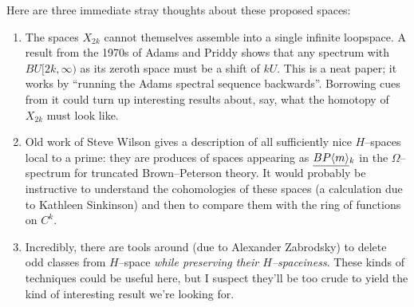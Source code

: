 \documentclass{amsart}
\newcommand{\<}{\langle}
\renewcommand{\>}{\rangle}
\newcommand{\OS}[2]{\smash{\underline{#1}}_{#2}}
\theoremstyle{plain}
\theoremstyle{definition}
\theoremstyle{remark}
\begin{document}
Here are three immediate stray thoughts about these proposed spaces:
\begin{enumerate}
\item The spaces $X_{2k}$ cannot themselves assemble into a single infinite loopspace. A result from the 1970s of Adams and Priddy shows that any spectrum with $BU[2k, \infty)$ as its zeroth space must be a shift of $kU$.  This is a neat paper; it works by ``running the Adams spectral sequence backwards''.  Borrowing cues from it could turn up interesting results about, say, what the homotopy of $X_{2k}$ must look like.
\item Old work of Steve Wilson gives a description of all sufficiently nice $H$--spaces local to a prime: they are produces of spaces appearing as $\OS{BP\<m\>}{k}$ in the $\Omega$--spectrum for truncated Brown--Peterson theory.  It would probably be instructive to understand the cohomologies of these spaces (a calculation due to Kathleen Sinkinson) and then to compare them with the ring of functions on $C^k$.
\item Incredibly, there are tools around (due to Alexander Zabrodsky) to delete odd classes from $H$--space \emph{while preserving their $H$--spaceiness}.  These kinds of techniques could be useful here, but I suspect they'll be too crude to yield the kind of interesting result we're looking for.
\end{enumerate}


\newpage
\end{document}
